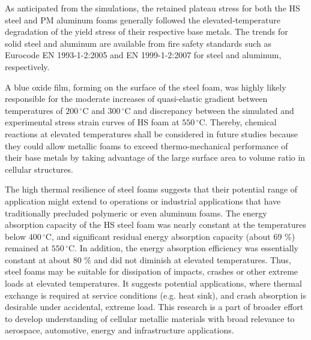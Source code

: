 \documentclass[review]{elsarticle}
\begin{document}
{As anticipated from the simulations, the retained plateau stress for both the HS steel and PM aluminum foams generally followed the elevated-temperature degradation of the yield stress of their respective base metals. The trends for solid steel and aluminum are available from fire safety standards such as Eurocode EN 1993-1-2:2005 and EN 1999-1-2:2007 for steel and aluminum, respectively. 

A blue oxide film, forming on the surface of the steel foam, was highly likely responsible for the moderate increases of quasi-elastic gradient between temperatures of $200\,^{\circ}\mathrm{C}$ and $300\,^{\circ}\mathrm{C}$ and discrepancy between the simulated and experimental stress strain curves of HS foam at $550\,^{\circ}\mathrm{C}$.  Thereby, chemical reactions at elevated temperatures shall be considered in future studies because they could allow metallic foams to exceed thermo-mechanical performance of their base metals by taking advantage of the large surface area to volume ratio in cellular structures.

The high thermal resilience of steel foams suggests that their potential range of application might extend to operations or industrial applications that have traditionally precluded polymeric or even aluminum foams. The energy absorption capacity of the HS steel foam was nearly constant at the temperatures below $400\,^{\circ}\mathrm{C}$, and significant residual energy absorption capacity (about 69 \%) remained at $550\,^{\circ}\mathrm{C}$. In addition, the energy absorption efficiency was essentially constant at about 80 \% and did not diminish at elevated temperatures. Thus, steel foams may be suitable for dissipation of impacts, crashes or other extreme loads at elevated temperatures. It suggests potential applications, where thermal exchange is required at service conditions (e.g. heat sink), and crash absorption is desirable under accidental, extreme load. This research is a part of broader effort to develop understanding of cellular metallic materials with broad relevance to aerospace, automotive, energy and infrastructure applications.

}
\end{document}
